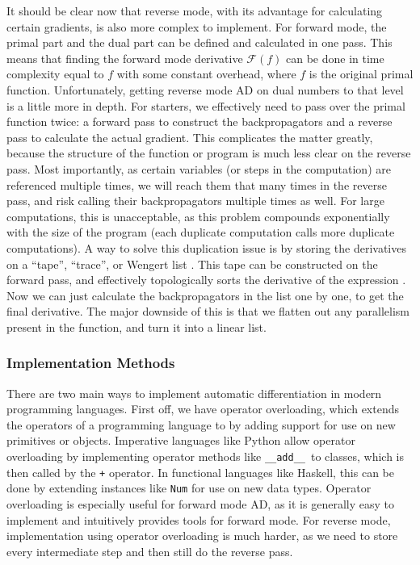 \documentclass{article}
\newcommand{\fw}[1]{\mathcal{F}(#1)}
\begin{document}
            It should be clear now that reverse mode, with its advantage for calculating certain gradients, is also more complex to implement.
            For forward mode, the primal part and the dual part can be defined and calculated in one pass.
            This means that finding the forward mode derivative $\fw{f}$ can be done in time complexity equal to $f$ with some constant overhead, where $f$ is the original primal function.
            Unfortunately, getting reverse mode AD on dual numbers to that level is a little more in depth.
            For starters, we effectively need to pass over the primal function twice: a forward pass to construct the backpropagators and a reverse pass to calculate the actual gradient.
            This complicates the matter greatly, because the structure of the function or program is much less clear on the reverse pass.
            Most importantly, as certain variables (or steps in the computation) are referenced multiple times, we will reach them that many times in the reverse pass, and risk calling their backpropagators multiple times as well.
            For large computations, this is unacceptable, as this problem compounds exponentially with the size of the program (each duplicate computation calls more duplicate computations).
            A way to solve this duplication issue is by storing the derivatives on a ``tape'', ``trace'', or Wengert list \cite{griewank2008evaluating}.
            This tape can be constructed on the forward pass, and effectively topologically sorts the derivative of the expression \cite{smeding2022efficient,krawiec2022provably}.
            Now we can just calculate the backpropagators in the list one by one, to get the final derivative.
            The major downside of this is that we flatten out any parallelism present in the function, and turn it into a linear list.

            \subsubsection{Implementation Methods}
                There are two main ways to implement automatic differentiation in modern programming languages.
                First off, we have operator overloading, which extends the operators of a programming language to by adding support for use on new primitives or objects.
                Imperative languages like Python allow operator overloading by implementing operator methods like \texttt{\_\_add\_\_}\ to classes, which is then called by the \texttt{+} operator.
                In functional languages like Haskell, this can be done by extending instances like \texttt{Num} for use on new data types.
                Operator overloading is especially useful for forward mode AD, as it is generally easy to implement and intuitively provides tools for forward mode.
                For reverse mode, implementation using operator overloading is much harder, as we need to store every intermediate step and then still do the reverse pass.
                
\end{document}
